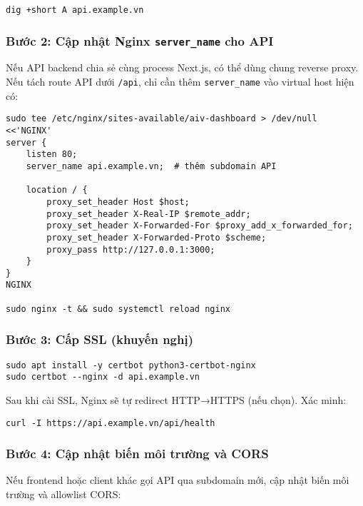 \documentclass[12pt,a4paper]{article}
\begin{document}
\begin{lstlisting}[caption=Kiểm tra phân giải DNS]
dig +short A api.example.vn
\end{lstlisting}

\subsubsection{Bước 2: Cập nhật Nginx \texttt{server\_name} cho API}

Nếu API backend chia sẻ cùng process Next.js, có thể dùng chung reverse proxy. Nếu tách route API dưới \texttt{/api}, chỉ cần thêm \texttt{server\_name} vào virtual host hiện có:

\begin{lstlisting}[caption=Thêm server_name cho subdomain API]
sudo tee /etc/nginx/sites-available/aiv-dashboard > /dev/null <<'NGINX'
server {
    listen 80;
    server_name api.example.vn;  # thêm subdomain API

    location / {
        proxy_set_header Host $host;
        proxy_set_header X-Real-IP $remote_addr;
        proxy_set_header X-Forwarded-For $proxy_add_x_forwarded_for;
        proxy_set_header X-Forwarded-Proto $scheme;
        proxy_pass http://127.0.0.1:3000;
    }
}
NGINX

sudo nginx -t && sudo systemctl reload nginx
\end{lstlisting}

\subsubsection{Bước 3: Cấp SSL (khuyến nghị)}

\begin{lstlisting}[caption=Cấp chứng chỉ Let's Encrypt cho subdomain API]
sudo apt install -y certbot python3-certbot-nginx
sudo certbot --nginx -d api.example.vn
\end{lstlisting}

Sau khi cài SSL, Nginx sẽ tự redirect HTTP→HTTPS (nếu chọn). Xác minh:

\begin{lstlisting}
curl -I https://api.example.vn/api/health
\end{lstlisting}

\subsubsection{Bước 4: Cập nhật biến môi trường và CORS}

Nếu frontend hoặc client khác gọi API qua subdomain mới, cập nhật biến môi trường và allowlist CORS:
\end{document}
